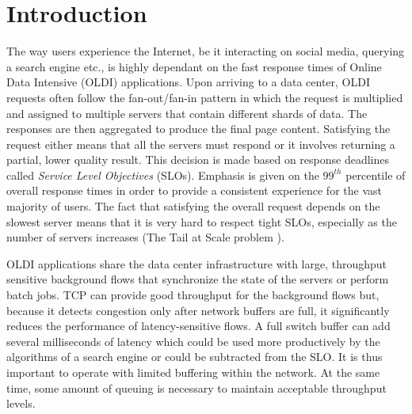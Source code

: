 \documentclass[10pt,conference,compsocconf]{IEEEtran}
\begin{document}
\section{Introduction}
The way users experience the Internet, be it interacting on social media, querying a search engine etc., is highly dependant on the fast response times of Online Data Intensive (OLDI) applications. Upon arriving to a data center, OLDI requests often follow the fan-out/fan-in pattern in which the request is multiplied and assigned to multiple servers that contain different shards of data. The responses are then aggregated to produce the final page content. Satisfying the request either means that all the servers must respond or it involves returning a partial, lower quality result. This decision is made based on response deadlines called \textit{Service Level Objectives} (SLOs). Emphasis is given on the $99^{th}$ percentile of overall response times in order to provide a consistent experience for the vast majority of users. The fact that satisfying the overall request depends on the slowest server means that it is very hard to respect tight SLOs, especially as the number of servers increases (The Tail at Scale problem \cite{TAIL}). 

OLDI applications share the data center infrastructure with large, throughput sensitive background flows that synchronize the state of the servers or perform batch jobs. TCP can provide good throughput for the background flows but, because it detects congestion only after network buffers are full, it significantly reduces the performance of latency-sensitive flows. A full switch buffer can add several milliseconds of latency which could be used more productively by the algorithms of a search engine or could be subtracted from the SLO. It is thus important to operate with limited buffering within the network. At the same time, some amount of queuing is necessary to maintain acceptable throughput levels.
\end{document}
